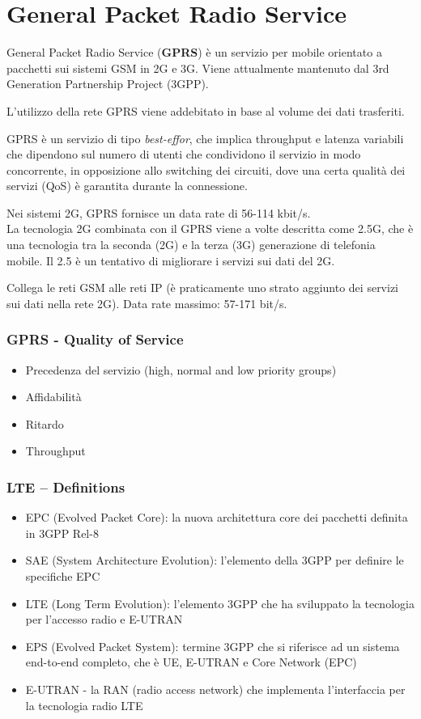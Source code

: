 \section{General Packet Radio Service}
\label{sec:gprs}

General Packet Radio Service (\textbf{GPRS}) è un servizio per mobile orientato 
a pacchetti sui sistemi GSM in 2G e 3G. Viene attualmente mantenuto dal 3rd 
Generation Partnership Project (3GPP).

L'utilizzo della rete GPRS viene addebitato in base al volume dei dati 
trasferiti.

GPRS è un servizio di tipo \textit{best-effor}, che implica throughput e 
latenza variabili che dipendono sul numero di utenti che condividono il
servizio in modo concorrente, in opposizione allo switching dei circuiti,
dove una certa qualità dei servizi (QoS) è garantita durante la connessione.

Nei sistemi 2G, GPRS fornisce un data rate di 56-114 kbit/s.\\

La tecnologia 2G combinata con il GPRS viene a volte descritta come 2.5G,
che è una tecnologia tra la seconda (2G) e la terza (3G) generazione di 
telefonia mobile. Il 2.5 è un tentativo di migliorare i servizi sui dati 
del 2G.

Collega le reti GSM alle reti IP (è praticamente uno strato aggiunto dei 
servizi sui dati nella rete 2G). Data rate massimo: 57-171 bit/s.

\subsubsection{GPRS - Quality of Service}
\begin{itemize}
  \item Precedenza del servizio (high, normal and low priority groups)
  \item Affidabilità
  \item Ritardo
  \item Throughput
\end{itemize}

\subsubsection{LTE – Definitions}

\begin{itemize}
  \item EPC (Evolved Packet Core): la nuova architettura core dei pacchetti 
  definita in 3GPP Rel-8
  \item SAE (System Architecture Evolution): l'elemento della 3GPP per
definire le specifiche EPC
  \item LTE (Long Term Evolution): l'elemento 3GPP che ha sviluppato la tecnologia
  per l'accesso radio e E-UTRAN
  \item EPS (Evolved Packet System): termine 3GPP che si riferisce ad un sistema 
  end-to-end completo, che è UE, E-UTRAN e Core Network (EPC)
  \item E-UTRAN - la RAN (radio access network) che implementa l'interfaccia per la 
  tecnologia radio LTE
\end{itemize}

